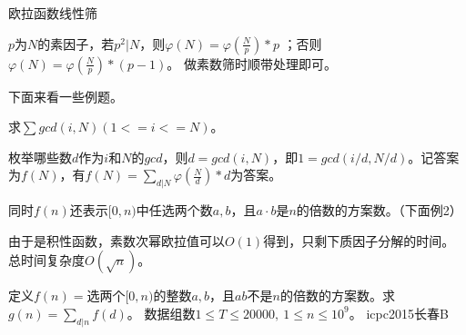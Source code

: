 \vbox{}

{\heiti 欧拉函数线性筛}

$p$为$N$的素因子，若$p^2 | N$，则$\varphi(N)=\varphi(\frac{N}{p})*p$ ；否则$\varphi(N)=\varphi(\frac{N}{p})*(p-1)$。
做素数筛时顺带处理即可。



\vbox{}

{\heiti 下面来看一些例题。}

\vbox{}

\begin{example}
求$\sum gcd(i, N)(1<=i <=N)$。\quad [HYSBZ - 2705 ]
\end{example}

\begin{solution}
枚举哪些数$d$作为$i$和$N$的$gcd$，则$d=gcd(i,N)$，即$1=gcd(i/d,N/d)$。记答案为$f(N)$，有$f(N)=\sum_{d|N}\varphi(\frac{N}{d})*d$为答案。

同时$f(n)$还表示$[0,n)$中任选两个数$a,b$，且$a\cdot b$是$n$的倍数的方案数。（下面例2）

由于是积性函数，素数次幂欧拉值可以$O(1)$得到，只剩下质因子分解的时间。总时间复杂度$O(\sqrt{n})$。
\end{solution}

\vbox{}

\begin{example}
定义$f(n)=$选两个$[0,n)$的整数$a,b$，且$ab$不是$n$的倍数的方案数。求$g(n)=\sum_{d|n}f(d)$。
数据组数$1\le T\le 20000,\ 1\le n \le 10^9$。  \quad [HDU - 5528 ] icpc2015长春B
\end{example}

